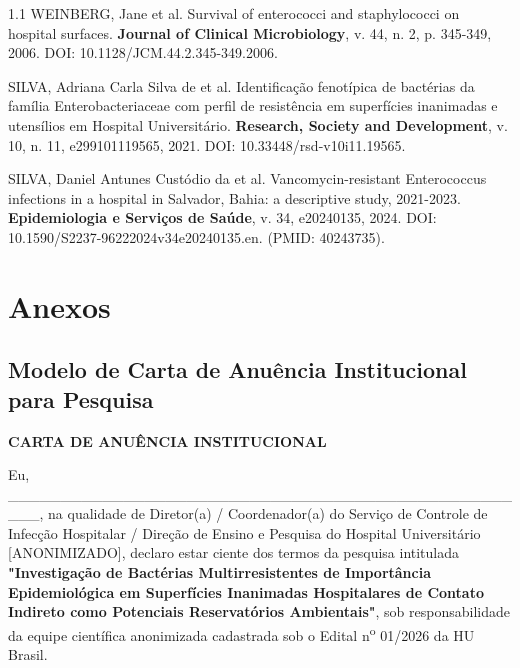 \documentclass[12pt,a4paper]{article}
\begin{document}
\begin{spacing}{1.1}
\vspace{12pt}
\noindent WEINBERG, Jane et al. Survival of enterococci and staphylococci on hospital surfaces. \textbf{Journal of Clinical Microbiology}, v. 44, n. 2, p. 345-349, 2006. DOI: 10.1128/JCM.44.2.345-349.2006.

\vspace{12pt}
\noindent SILVA, Adriana Carla Silva de et al. Identificação fenotípica de bactérias da família Enterobacteriaceae com perfil de resistência em superfícies inanimadas e utensílios em Hospital Universitário. \textbf{Research, Society and Development}, v. 10, n. 11, e299101119565, 2021. DOI: 10.33448/rsd-v10i11.19565.

\vspace{12pt}
\noindent SILVA, Daniel Antunes Custódio da et al. Vancomycin-resistant Enterococcus infections in a hospital in Salvador, Bahia: a descriptive study, 2021-2023. \textbf{Epidemiologia e Serviços de Saúde}, v. 34, e20240135, 2024. DOI: 10.1590/S2237-96222024v34e20240135.en. (PMID: 40243735).
\end{spacing}
\newpage

\section{Anexos}

\subsection{Modelo de Carta de Anuência Institucional para Pesquisa}

\begin{center}
    \textbf{CARTA DE ANUÊNCIA INSTITUCIONAL}
\end{center}

\noindent Eu, \_\_\_\_\_\_\_\_\_\_\_\_\_\_\_\_\_\_\_\_\_\_\_\_\_\_\_\_\_\_\_\_\_\_\_\_\_\_\_\_\_\_\_\_\_\_\_\_\_\_\_, na qualidade de Diretor(a) / Coordenador(a) do Serviço de Controle de Infecção Hospitalar / Direção de Ensino e Pesquisa do Hospital Universitário [ANONIMIZADO], declaro estar ciente dos termos da pesquisa intitulada \textbf{"Investigação de Bactérias Multirresistentes de Importância Epidemiológica em Superfícies Inanimadas Hospitalares de Contato Indireto como Potenciais Reservatórios Ambientais"}, sob responsabilidade da equipe científica anonimizada cadastrada sob o Edital n\textsuperscript{o} 01/2026 da HU Brasil.
\end{document}
